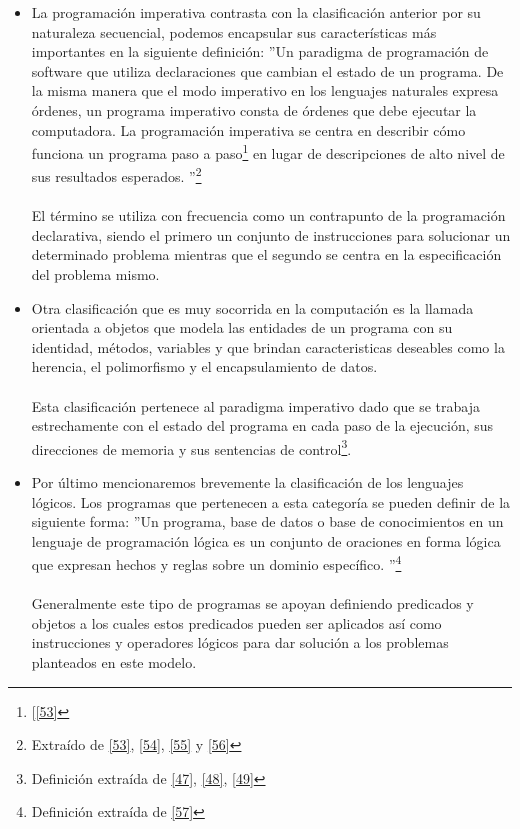 \begin{itemize}
        \item  La programación imperativa contrasta con la clasificación anterior por su naturaleza secuencial, podemos encapsular sus características más importantes en la siguiente definición: 
         ''Un paradigma de programación de software que utiliza declaraciones que cambian el estado de un programa. De la misma manera que el modo imperativo en los lenguajes naturales expresa órdenes, un programa imperativo consta de órdenes que debe ejecutar la computadora. La programación imperativa se centra en describir cómo funciona un programa paso a paso\footnote{[\hyperlink{53}{[53]}} en lugar de descripciones de alto nivel de sus resultados esperados. ''\footnote{Extraído de \hyperlink{53}{[53]}, \hyperlink{54}{[54]}, \hyperlink{55}{[55]} y \hyperlink{56}{[56]}}\\\\
        El término se utiliza con frecuencia como un contrapunto de la programación declarativa, siendo el primero un conjunto de instrucciones para solucionar un determinado problema mientras que el segundo se centra en la especificación del problema mismo.\\

        \item     Otra clasificación que es muy socorrida en la computación es la llamada orientada a objetos que modela las entidades de un programa con su identidad, métodos, variables y que brindan caracteristicas deseables como la herencia, el polimorfismo y el encapsulamiento de datos.\\\\
        Esta clasificación pertenece al paradigma imperativo dado que se trabaja estrechamente con el estado del programa en cada paso de la ejecución, sus direcciones de memoria y sus sentencias de control\footnote{Definición extraída de \hyperlink{47}{[47]}, \hyperlink{48}{[48]}, \hyperlink{49}{[49]}}.\\
    
        \item     Por último mencionaremos brevemente la clasificación de los lenguajes lógicos. Los programas que pertenecen a esta categoría se pueden definir de la siguiente forma:  ''Un programa, base de datos o base de conocimientos en un lenguaje de programación lógica es un conjunto de oraciones en forma lógica que expresan hechos y reglas sobre un dominio específico. ''\footnote{Definición extraída de \hyperlink{57}{[57]}} \\\\
        Generalmente este tipo de programas se apoyan definiendo predicados y objetos a los cuales estos predicados pueden ser aplicados así como instrucciones y operadores lógicos para dar solución a los problemas planteados en este modelo.

    
    \end{itemize}

